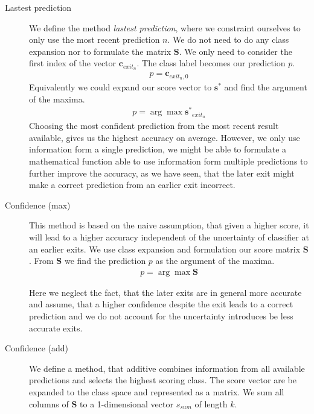 \begin{description}
	
	\item[Lastest prediction] We define the method \emph{lastest prediction}, where we constraint ourselves to only use the most recent prediction $n$. We do not need to do any class expansion nor to formulate the matrix $\mathbf{S}$. We only need to consider the first index of the vector $\mathbf{c}_{exit_n}$. The class label becomes our prediction $p$.
	\begin{align*}
		p = \mathbf{c}_{exit_n,0}
	\end{align*}
	Equivalently we could expand our score vector to $\mathbf{s^*}$ and find the argument of the maxima.
	\begin{align*}
	p = \arg \max \mathbf{s^*}_{exit_n}	
	\end{align*}
	 Choosing the most confident prediction from the most recent result available, gives us the highest accuracy on average. However, we only use information form a single prediction, we might be able to formulate a mathematical function able to use information form multiple predictions to further improve the accuracy, as we have seen, that the later exit might make a correct prediction from an earlier exit incorrect. 
	 
	\item[Confidence (max)] This method is based on the naive assumption, that given a higher score, it will lead to a higher accuracy independent of the uncertainty of classifier at an earlier exits. We use class expansion and  formulation our score matrix $\mathbf{S}$. From $\mathbf{S}$ we find the prediction $p$ as the argument of the maxima.
	\begin{align*}
	p = \arg \max  \mathbf{S}
	\end{align*}
	
	Here we neglect the fact, that the later exits are in general more accurate and assume, that a higher confidence despite the exit leads to a correct prediction and we do not account for the uncertainty introduces be less accurate exits.

	\item[Confidence (add)] We define a method, that additive combines information from all available predictions and selects the highest scoring class. The score vector are be expanded to the class space and represented as a matrix. We sum all columns of $\mathbf{S}$ to a 1-dimensional vector $s_{sum}$ of length $k$. 
	

\end{description}
